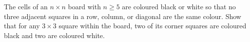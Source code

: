 \documentclass[varwidth]{standalone}
\begin{document}
    The cells of an $n \times n$ board with $n \geq 5$ are coloured black or white so that no three adjacent squares in a row, column, or diagonal are the same colour. Show that for any $3 \times 3$ square within the board, two of its corner squares are coloured black and two are coloured white. 
\end{document}
